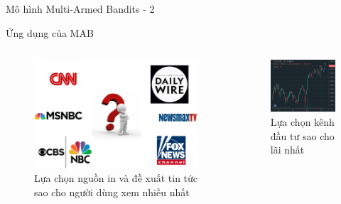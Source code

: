 \begin{frame}{Mô hình Multi-Armed Bandits - 2}
    \begin{block}{Ứng dụng của MAB}
        \begin{columns}
            \begin{column}{0.45\textwidth}
                \begin{figure}
                    \centering
                    \includegraphics[width=0.7\linewidth]{figure/preliminary/news.eps}
                    \caption{Lựa chọn nguồn in và đề xuất tin tức sao cho người dùng xem nhiều nhất}
                    \label{fig:preliminary:news}
                \end{figure}
            \end{column}
            \begin{column}{0.45\textwidth}
                \begin{figure}
                    \centering
                    \includegraphics[width=0.7\linewidth]{figure/preliminary/eth-usd.png}
                    \caption{Lựa chọn kênh đầu tư sao cho lãi nhất}
                    \label{fig:preliminary:invest}
                \end{figure}
            \end{column}
        \end{columns}
    \end{block}
\end{frame}
